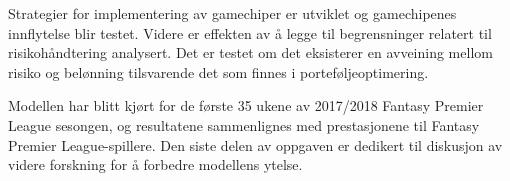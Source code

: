\newpar

Strategier for implementering av gamechiper er utviklet og gamechipenes innflytelse blir testet. Videre er effekten av {\aa} legge til begrensninger relatert til risikoh\aa ndtering analysert. Det er testet om det eksisterer en avveining mellom risiko og bel\o nning tilsvarende det som finnes i portef\o ljeoptimering.

\newpar

Modellen har blitt kj\o rt for de f\o rste 35 ukene av 2017/2018 Fantasy Premier League sesongen, og resultatene sammenlignes med prestasjonene til Fantasy Premier League-spillere. Den siste delen av oppgaven er dedikert til diskusjon av videre forskning for {\aa} forbedre modellens ytelse.

